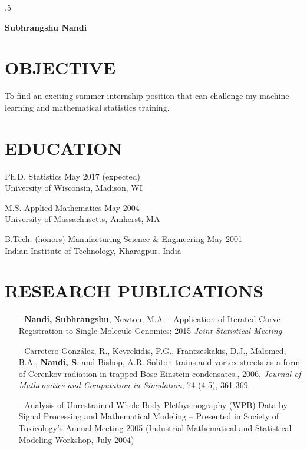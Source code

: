 \documentclass[11pt]{res} %
\begin{document}
 
\thispagestyle{empty} %

\moveleft.5\hoffset\centerline{\large\bf Subhrangshu Nandi}
\address{1300 University Ave, Suite 1250D \\   Madison, WI 53706  \\ (413) 530-1400}
\address{snandi@wisc.edu \\ nands31@gmail.com  \\ www.linkedin.com/in/nands31}
                                             
\begin{resume}
 
\section{OBJECTIVE}
To find an exciting summer internship position that can challenge my machine learning and mathematical statistics training.
 
\section{EDUCATION} 
Ph.D. Statistics \hfill May 2017 (expected)\\
\noindent University of Wisconsin, Madison, WI

M.S. Applied Mathematics \hfill May 2004 \\
\noindent University of Massachusetts, Amherst, MA

B.Tech. (honors) Manufacturing Science \& Engineering \hfill May 2001 \\
\noindent Indian Institute of Technology, Kharagpur, India

\section{RESEARCH PUBLICATIONS} 
\begin{itemize}[leftmargin=*]
\item[-] {\bf{Nandi, Subhrangshu}}, Newton, M.A. - Application of Iterated Curve Registration to Single
Molecule Genomics; 2015 {\emph{Joint Statistical Meeting}}
\item[-] Carretero-González, R., Kevrekidis, P.G., Frantzeskakis, D.J., Malomed, B.A., {\bf{Nandi, S}}. and
Bishop, A.R. Soliton trains and vortex streets as a form of Cerenkov radiation in trapped
Bose-Einstein condensates., 2006, {\emph{Journal of Mathematics and Computation in
Simulation}}, 74 (4-5), 361-369
\item[-] Analysis of Unrestrained Whole-Body Plethysmography (WPB) Data by Signal Processing and
Mathematical Modeling – Presented in Society of Toxicology’s Annual Meeting 2005
(Industrial Mathematical and Statistical Modeling Workshop, July 2004)
\end{itemize}


\end{resume}
\end{document}
